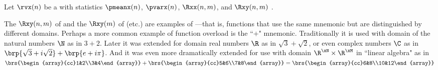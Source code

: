 \begin{definition}
\label{def:mean_wss}
\label{def:Rxxm}
\label{def:Rxym}
Let $\rvx(n)$ be a  with statistics 
$\pmeanx(n)$, $\pvarx(n)$, $\Rxx(n,m)$, and $\Rxy(n,m)$ .
\end{definition}

\begin{remark}
  The $\Rxy(n,m)$ of  and the $\Rxy(m)$ of  (etc.) are examples
  of ---that is, functions that use the same 
  mnemonic but are distinguished by different domains.
  Perhaps a more common example of function overload is the ``$+$" mnemonic. 
  Traditionally it is used with domain of the natural numbers $\N$ as in $3+2$.
  Later it was extended for domain real numbers $\R$ as in $\sqrt{3}+\sqrt{2}$,
  or even complex numbers $\C$ as in $\brp{\sqrt{3}+i\sqrt{2}}+\brp{e+i\pi}$.
  And it was even more dramatically extended for use with domain $\R^\xN\times\R^\xM$
  in ``linear algebra" as in
  \\\indentx$
    \brs{\begin{array}{cc}1&2\\3&4\end{array}} +
    \brs{\begin{array}{cc}5&6\\7&8\end{array}} =
    \brs{\begin{array}{cc}6&8\\10&12\end{array}}
   $
\end{remark}

